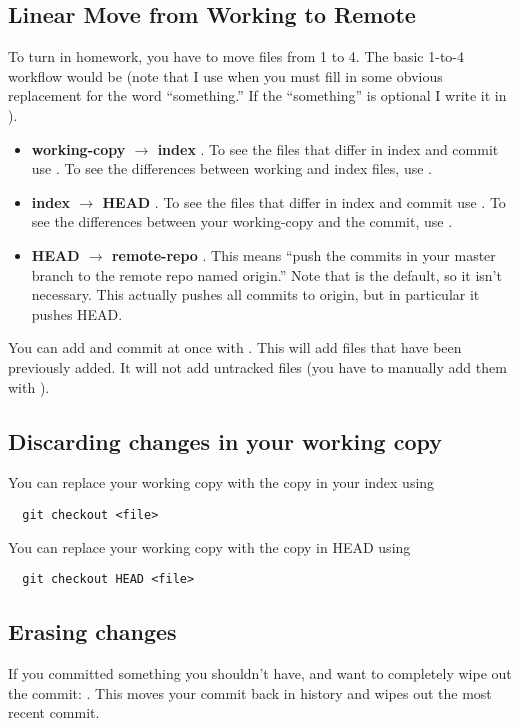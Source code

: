 \subsection{Linear Move from Working to Remote}
To turn in homework, you have to move files from 1 to 4.  The basic 1-to-4 workflow would be (note that I use  when you must fill in some obvious replacement for the word ``something.''  If the ``something'' is optional I write it in ).
\begin{itemize}
  \item {\bf working-copy $\to$ index} .  To see the files that differ in index and commit use .  To see the differences between working and index files, use .
  \item {\bf index $\to$ HEAD} .  To see the files that differ in index and commit use .  To see the differences between your working-copy and the commit, use .
  \item {\bf HEAD $\to$ remote-repo} .  This means ``push the commits in your master branch to the remote repo named origin.''  Note that  is the default, so it isn't necessary.  This actually pushes all commits to origin, but in particular it pushes HEAD.
\end{itemize}

You can add and commit at once with .  This will add files that have been previously added.  It will not add untracked files (you have to manually add them with ).

\subsection{Discarding changes in your working copy}
You can replace your working copy with the copy in your index using
\begin{verbatim}
  git checkout <file>
\end{verbatim}

You can replace your working copy with the copy in HEAD using
\begin{verbatim}
  git checkout HEAD <file>
\end{verbatim}

\subsection{Erasing changes}
If you committed something you shouldn't have, and want to completely wipe out the commit:
.  This moves your commit back in history and wipes out the most recent commit.

